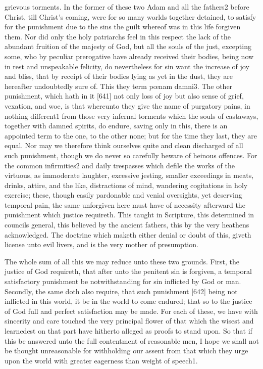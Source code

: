 grievous torments. In the former of these two Adam and all the fathers2 before Christ, till Christ’s coming, were for so many worlds together detained, to satisfy for the punishment due to the sins the guilt whereof was in this life forgiven them. Nor did only the holy patriarchs feel in this respect the lack of the abundant fruition of the majesty of God, but all the souls of the just, excepting some, who by peculiar prerogative have already received their bodies, being now in rest and unspeakable felicity, do nevertheless for sin want the increase of joy and bliss, that by receipt of their bodies lying as yet in the dust, they are hereafter undoubtedly sure of. This they term pœnam damni3. The other punishment, which hath in it [641] not only loss of joy but also sense of grief, vexation, and woe, is that whereunto they give the name of purgatory pains, in nothing different1 from those very infernal torments which the souls of castaways, together with damned spirits, do endure, saving only in this, there is an appointed term to the one, to the other none; but for the time they last, they are equal. Nor may we therefore think ourselves quite and clean discharged of all such punishment, though we do never so carefully beware of heinous offences. For the common infirmities2 and daily trespasses which defile the works of the virtuous, as immoderate laughter, excessive jesting, smaller exceedings in meats, drinks, attire, and the like, distractions of mind, wandering cogitations in holy exercise; these, though easily pardonable and venial oversights, yet deserving temporal pain, the same unforgiven here must have of necessity afterward the punishment which justice requireth. This taught in Scripture, this determined in councils general, this believed by the ancient fathers, this by the very heathens acknowledged. The doctrine which maketh either denial or doubt of this, giveth license unto evil livers, and is the very mother of presumption.

The whole sum of all this we may reduce unto these two grounds. First, the justice of God requireth, that after unto the penitent sin is forgiven, a temporal satisfactory punishment be notwithstanding for sin inflicted by God or man. Secondly, the same doth also require, that such punishment [642] being not inflicted in this world, it be in the world to come endured; that so to the justice of God full and perfect satisfaction may be made. For each of these, we have with sincerity and care touched the very principal flower of that which the wisest and learnedest on that part have hitherto alleged as proofs to stand upon. So that if this be answered unto the full contentment of reasonable men, I hope we shall not be thought unreasonable for withholding our assent from that which they urge upon the world with greater eagerness than weight of speech1.

